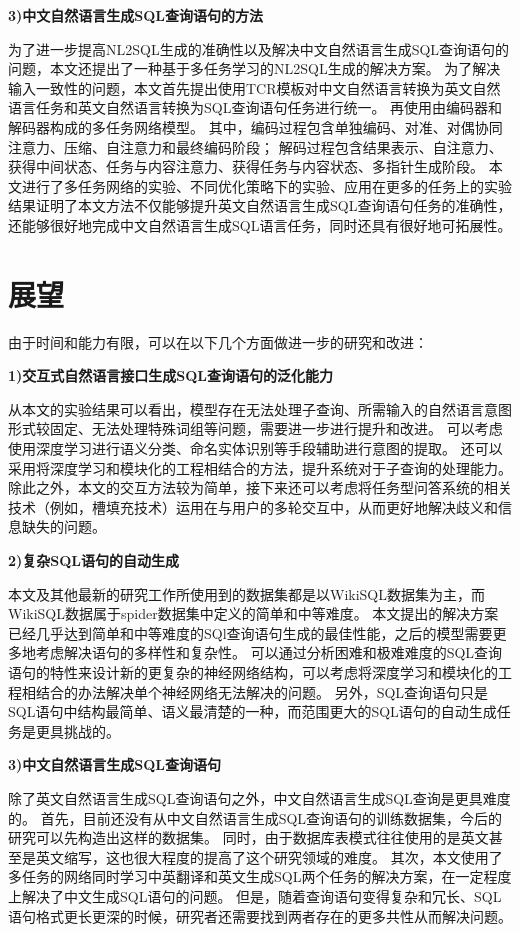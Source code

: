 \textbf{3)中文自然语言生成SQL查询语句的方法}

为了进一步提高NL2SQL生成的准确性以及解决中文自然语言生成SQL查询语句的问题，本文还提出了一种基于多任务学习的NL2SQL生成的解决方案。
为了解决输入一致性的问题，本文首先提出使用TCR模板对中文自然语言转换为英文自然语言任务和英文自然语言转换为SQL查询语句任务进行统一。
再使用由编码器和解码器构成的多任务网络模型。
其中，编码过程包含单独编码、对准、对偶协同注意力、压缩、自注意力和最终编码阶段；
解码过程包含结果表示、自注意力、获得中间状态、任务与内容注意力、获得任务与内容状态、多指针生成阶段。
本文进行了多任务网络的实验、不同优化策略下的实验、应用在更多的任务上的实验结果证明了本文方法不仅能够提升英文自然语言生成SQL查询语句任务的准确性，还能够很好地完成中文自然语言生成SQL语言任务，同时还具有很好地可拓展性。

\section{展望}

由于时间和能力有限，可以在以下几个方面做进一步的研究和改进：

\textbf{1)交互式自然语言接口生成SQL查询语句的泛化能力}

从本文的实验结果可以看出，模型存在无法处理子查询、所需输入的自然语言意图形式较固定、无法处理特殊词组等问题，需要进一步进行提升和改进。
可以考虑使用深度学习进行语义分类、命名实体识别等手段辅助进行意图的提取。
还可以采用将深度学习和模块化的工程相结合的方法，提升系统对于子查询的处理能力。
除此之外，本文的交互方法较为简单，接下来还可以考虑将任务型问答系统的相关技术（例如，槽填充技术）运用在与用户的多轮交互中，从而更好地解决歧义和信息缺失的问题。


\textbf{2)复杂SQL语句的自动生成}

本文及其他最新的研究工作所使用到的数据集都是以WikiSQL数据集为主，而WikiSQL数据属于spider数据集中定义的简单和中等难度。
本文提出的解决方案已经几乎达到简单和中等难度的SQl查询语句生成的最佳性能，之后的模型需要更多地考虑解决语句的多样性和复杂性。
可以通过分析困难和极难难度的SQL查询语句的特性来设计新的更复杂的神经网络结构，可以考虑将深度学习和模块化的工程相结合的办法解决单个神经网络无法解决的问题。
另外，SQL查询语句只是SQL语句中结构最简单、语义最清楚的一种，而范围更大的SQL语句的自动生成任务是更具挑战的。

\textbf{3)中文自然语言生成SQL查询语句}

除了英文自然语言生成SQL查询语句之外，中文自然语言生成SQL查询是更具难度的。
首先，目前还没有从中文自然语言生成SQL查询语句的训练数据集，今后的研究可以先构造出这样的数据集。
同时，由于数据库表模式往往使用的是英文甚至是英文缩写，这也很大程度的提高了这个研究领域的难度。
其次，本文使用了多任务的网络同时学习中英翻译和英文生成SQL两个任务的解决方案，在一定程度上解决了中文生成SQL语句的问题。
但是，随着查询语句变得复杂和冗长、SQL语句格式更长更深的时候，研究者还需要找到两者存在的更多共性从而解决问题。



